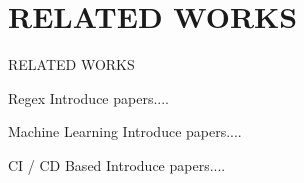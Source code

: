 \section{RELATED WORKS}
\begin{frame}{RELATED WORKS}
  \begin{block}{Regex}
    Introduce papers....
  \end{block}
  \begin{block}{Machine Learning}
    Introduce papers....
  \end{block}
  \begin{block}{CI / CD Based}
    Introduce papers....
  \end{block}
\end{frame}


